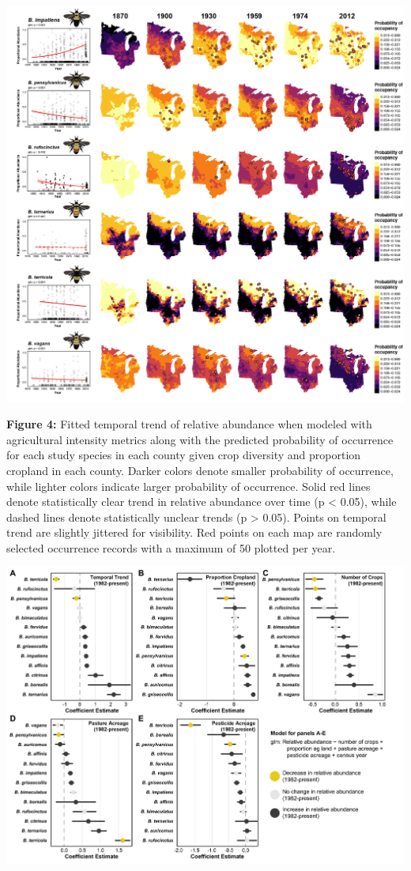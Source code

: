 \documentclass[11pt,]{article}
\begin{document}
\clearpage

\newpage

\includegraphics[width=1\textwidth,height=\textheight]{../ms_figs/fig4b.png}

\textbf{Figure 4:} Fitted temporal trend of relative abundance when
modeled with agricultural intensity metrics along with the predicted
probability of occurrence for each study species in each county given
crop diversity and proportion cropland in each county. Darker colors
denote smaller probability of occurrence, while lighter colors indicate
larger probability of occurrence. Solid red lines denote statistically
clear trend in relative abundance over time (p \textless{} 0.05), while
dashed lines denote statistically unclear trends (p \textgreater{}
0.05). Points on temporal trend are slightly jittered for visibility.
Red points on each map are randomly selected occurrence records with a
maximum of 50 plotted per year.

\clearpage

\newpage

\includegraphics[width=1\textwidth,height=\textheight]{../ms_figs/fig4.png}
\end{document}
